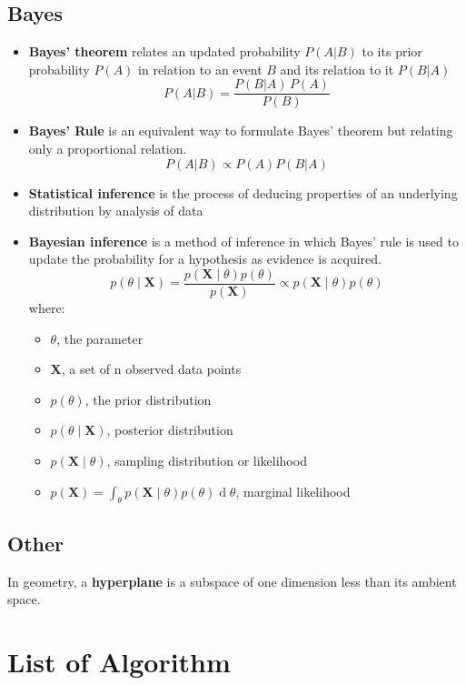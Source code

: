 \documentclass[twocolumn]{article}
\numberwithin{equation}{section}
\begin{document}
\subsection{Bayes}
\begin{itemize}
	\item \textbf{Bayes' theorem} relates an updated probability $P(A|B)$ to its prior probability $P(A)$ in relation to an event $B$ and its relation to it $P(B | A)$
$$P(A|B) = \frac{P(B | A)\, P(A)}{P(B)}$$
	\item \textbf{Bayes' Rule} is an equivalent way to formulate Bayes' theorem but relating only a proportional relation.
	$$P(A|B) \propto P(A)P(B|A) $$
	\item \textbf{Statistical inference} is the process of deducing properties of an underlying distribution by analysis of data
	\item \textbf{Bayesian inference} is a method of inference in which Bayes' rule is used to update the probability for a hypothesis as evidence is acquired.
$$p(\theta \mid \mathbf{X}) = \frac{p(\mathbf{X} \mid \theta) p(\theta)}{p(\mathbf{X})} \propto p(\mathbf{X} \mid \theta) p(\theta)$$
	where:
	\begin{itemize}
		\item $\theta$, the parameter
		\item $\mathbf{X}$, a set of n observed data points
		\item $p(\theta)$, the prior distribution
		\item $p(\theta \mid \mathbf{X})$, posterior distribution
		\item $ p(\mathbf{X} \mid \theta)$, sampling distribution or likelihood
		\item $p(\mathbf{X}) = \int_{\theta} p(\mathbf{X} \mid \theta) p(\theta) \operatorname{d}\!\theta $, marginal likelihood
	\end{itemize}

\end{itemize}


\subsection{Other}
In geometry, a \textbf{hyperplane} is a subspace of one dimension less than its ambient space.











\newpage
\section{List of Algorithm}
\end{document}
